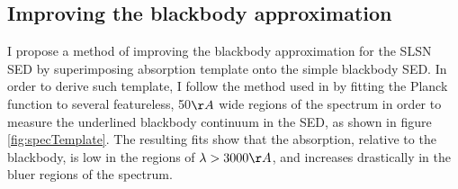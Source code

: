 \subsection{Improving the blackbody approximation}
I propose a method of improving the blackbody approximation for the SLSN SED by superimposing absorption template onto the simple blackbody SED. In order to derive such template, I follow the method used in \citet{2014ApJ...797...24V} by fitting the Planck function to several featureless, 50$\AA$ wide regions of the spectrum in order to measure the underlined blackbody continuum in the SED, as shown in figure \ref{fig:specTemplate}. The resulting fits show that the absorption, relative to the blackbody, is low in the regions of $\lambda>3000\AA$, and increases drastically in the bluer regions of the spectrum.

